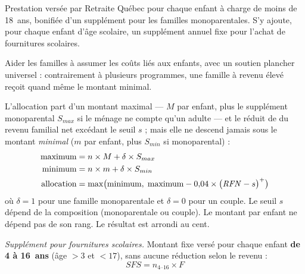 
\pdesc Prestation versée par Retraite Québec pour chaque enfant à charge de
moins de 18~ans, bonifiée d'un supplément pour les familles monoparentales.
S'y ajoute, pour chaque enfant d'âge scolaire, un supplément annuel fixe
pour l'achat de fournitures scolaires.

\pobj Aider les familles à assumer les coûts liés aux enfants, avec un
soutien plancher universel : contrairement à plusieurs programmes, une
famille à revenu élevé reçoit quand même le montant minimal.

\pregle L'allocation part d'un montant maximal --- $M$ par enfant, plus le
supplément monoparental $S_{max}$ si le ménage ne compte qu'un adulte --- et
le réduit de  du revenu familial net excédant le seuil $s$ ; mais elle
ne descend jamais sous le montant \emph{minimal} ($m$ par enfant, plus
$S_{min}$ si monoparental) :
\begin{align*}
\text{maximum} &= n \times M + \delta \times S_{max} \\
\text{minimum} &= n \times m + \delta \times S_{min} \\
\text{allocation} &= \max\bigl(\text{minimum},\;
\text{maximum} - 0{,}04 \times \bigl(\mathit{RFN} - s\bigr)^{+}\bigr)
\end{align*}
où $\delta = 1$ pour une famille monoparentale et $\delta = 0$ pour un
couple. Le seuil $s$ dépend de la composition (monoparentale ou couple). Le
montant par enfant ne dépend pas de son rang. Le résultat est arrondi au
cent.

\emph{Supplément pour fournitures scolaires.} Montant fixe versé pour chaque
enfant \textbf{de 4 à 16~ans} (âge $> 3$ et $< 17$), sans aucune réduction
selon le revenu :
\[
SFS = n_{4\text{--}16} \times F
\]

\pparams

